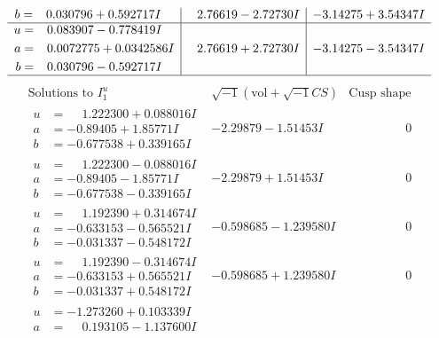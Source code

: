\documentclass[1p]{elsarticle_modified}
\theoremstyle{definition}
\newcommand{\I}{\sqrt{-1}}
\begin{document}
$$\begin{array}{c|c|c}
\begin{aligned}
b &= \phantom{-}0.030796 + 0.592717 I\end{aligned}
 & \phantom{-}2.76619 - 2.72730 I & -3.14275 + 3.54347 I \\ \hline\begin{aligned}
u &= \phantom{-}0.083907 - 0.778419 I \\
a &= \phantom{-}0.0072775 + 0.0342586 I \\
b &= \phantom{-}0.030796 - 0.592717 I\end{aligned}
 & \phantom{-}2.76619 + 2.72730 I & -3.14275 - 3.54347 I\\
 \hline 
 \end{array}$$\newpage$$\begin{array}{c|c|c}  
\text{Solutions to }I^u_{1}& \I (\text{vol} + \sqrt{-1}CS) & \text{Cusp shape}\\
 \hline 
\begin{aligned}
u &= \phantom{-}1.222300 + 0.088016 I \\
a &= -0.89405 + 1.85771 I \\
b &= -0.677538 + 0.339165 I\end{aligned}
 & -2.29879 - 1.51453 I & \phantom{-0.000000 } 0 \\ \hline\begin{aligned}
u &= \phantom{-}1.222300 - 0.088016 I \\
a &= -0.89405 - 1.85771 I \\
b &= -0.677538 - 0.339165 I\end{aligned}
 & -2.29879 + 1.51453 I & \phantom{-0.000000 } 0 \\ \hline\begin{aligned}
u &= \phantom{-}1.192390 + 0.314674 I \\
a &= -0.633153 - 0.565521 I \\
b &= -0.031337 - 0.548172 I\end{aligned}
 & -0.598685 - 1.239580 I & \phantom{-0.000000 } 0 \\ \hline\begin{aligned}
u &= \phantom{-}1.192390 - 0.314674 I \\
a &= -0.633153 + 0.565521 I \\
b &= -0.031337 + 0.548172 I\end{aligned}
 & -0.598685 + 1.239580 I & \phantom{-0.000000 } 0 \\ \hline\begin{aligned}
u &= -1.273260 + 0.103339 I \\
a &= \phantom{-}0.193105 - 1.137600 I \\

\end{aligned}
\end{array}$$
\end{document}
